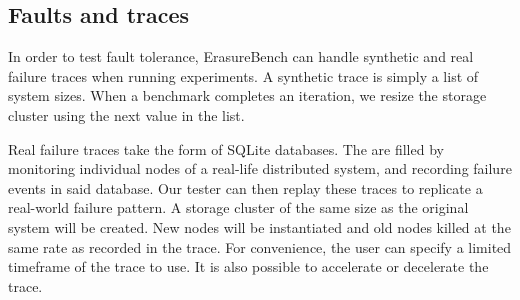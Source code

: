 \subsection{Faults and traces}

In order to test fault tolerance, ErasureBench can handle synthetic and real failure traces when running experiments. A synthetic trace is simply a list of system sizes. When a benchmark completes an iteration, we resize the storage cluster using the next value in the list.

Real failure traces take the form of SQLite databases. The are filled by monitoring individual nodes of a real-life distributed system, and recording failure events in said database.
Our tester can then replay these traces to replicate a real-world failure pattern.
A storage cluster of the same size as the original system will be created.
New nodes will be instantiated and old nodes killed at the same rate as recorded in the trace.
For convenience, the user can specify a limited timeframe of the trace to use.
It is also possible to accelerate or decelerate the trace.
